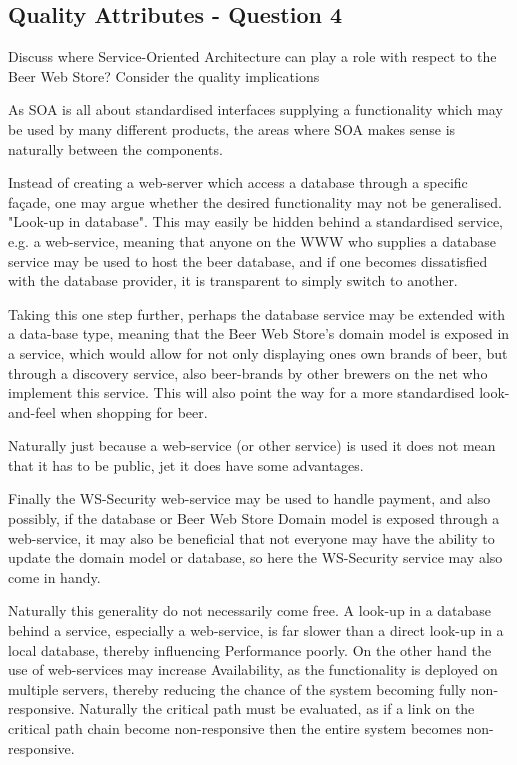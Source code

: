 \subsection{Quality Attributes - Question 4}
\label{sec:qa_q4}
\begin{question}
Discuss where Service-Oriented Architecture can play a role
with respect to the Beer Web Store? Consider the quality implications
\end{question}

As SOA is all about standardised interfaces supplying a functionality which may be used by many different products, the areas where SOA makes sense is naturally between the components. 

Instead of creating a web-server which access a database through a specific fa\c cade, one may argue whether the desired functionality may not be generalised. "Look-up in database". This may easily be hidden behind a standardised service, e.g. a web-service, meaning that anyone on the WWW who supplies a database service may be used to host the beer database, and if one becomes dissatisfied with the database provider, it is transparent to simply switch to another. 

Taking this one step further, perhaps the database service may be extended with a data-base type, meaning that the Beer Web Store's domain model is exposed in a service, which would allow for not only displaying ones own brands of beer, but through a discovery service, also beer-brands by other brewers on the net who implement this service. This will also point the way for a more standardised look-and-feel when shopping for beer.

Naturally just because a web-service (or other service) is used it does not mean that it has to be public, jet it does have some advantages.

Finally the WS-Security web-service may be used to handle payment, and also possibly, if the database or Beer Web Store Domain model is exposed through a web-service, it may also be beneficial that not everyone may have the ability to update the domain model or database, so here the WS-Security service may also come in handy.

Naturally this generality do not necessarily come free. A look-up in a database behind a service, especially a web-service, is far slower than a direct look-up in a local database, thereby influencing Performance poorly. On the other hand the use of web-services may increase Availability, as the functionality is deployed on multiple servers, thereby reducing the chance of the system becoming fully non-responsive. Naturally the critical path must be evaluated, as if a link on the critical path chain become non-responsive then the entire system becomes non-responsive.

